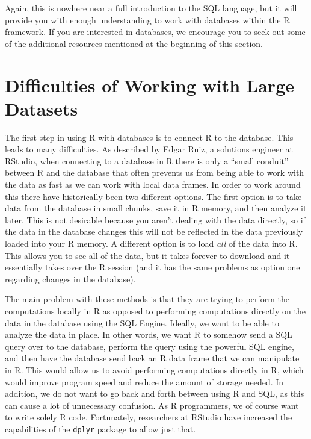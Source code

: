 \documentclass[]{krantz}
\begin{document}
Again, this is nowhere near a full introduction to the SQL language, but
it will provide you with enough understanding to work with databases
within the R framework. If you are interested in databases, we encourage
you to seek out some of the additional resources mentioned at the
beginning of this section.

\section{Difficulties of Working with Large
Datasets}\label{difficulties-of-working-with-large-datasets}

The first step in using R with databases is to connect R to the
database. This leads to many difficulties. As described by Edgar Ruiz, a
solutions engineer at RStudio, when connecting to a database in R there
is only a ``small conduit'' between R and the database that often
prevents us from being able to work with the data as fast as we can work
with local data frames. In order to work around this there have
historically been two different options. The first option is to take
data from the database in small chunks, save it in R memory, and then
analyze it later. This is not desirable because you aren't dealing with
the data directly, so if the data in the database changes this will not
be reflected in the data previously loaded into your R memory. A
different option is to load \emph{all} of the data into R. This allows
you to see all of the data, but it takes forever to download and it
essentially takes over the R session (and it has the same problems as
option one regarding changes in the database).

The main problem with these methods is that they are trying to perform
the computations locally in R as opposed to performing computations
directly on the data in the database using the SQL Engine. Ideally, we
want to be able to analyze the data in place. In other words, we want R
to somehow send a SQL query over to the database, perform the query
using the powerful SQL engine, and then have the database send back an R
data frame that we can manipulate in R. This would allow us to avoid
performing computations directly in R, which would improve program speed
and reduce the amount of storage needed. In addition, we do not want to
go back and forth between using R and SQL, as this can cause a lot of
unnecessary confusion. As R programmers, we of course want to write
solely R code. Fortunately, researchers at RStudio have increased the
capabilities of the \texttt{dplyr} package to allow just that.
\end{document}

